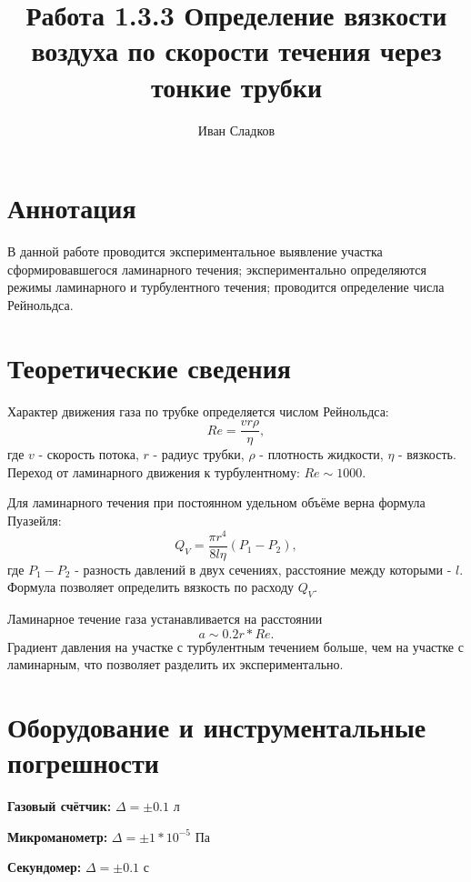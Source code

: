 \documentclass[a4paper]{article}
\title{Работа 1.3.3 Определение вязкости воздуха по скорости течения через тонкие трубки}
\author{Иван Сладков}
\begin{document}
\maketitle
\section{Аннотация}
В данной работе проводится экспериментальное выявление участка сформировавшегося ламинарного течения; экспериментально определяются режимы ламинарного и турбулентного течения; проводится определение числа Рейнольдса.
\section{Теоретические сведения}
Характер движения газа по трубке определяется числом Рейнольдса:
\begin{equation}
Re = \frac{v r \rho}{\eta},
\label{eq:Re}
\end{equation}
где $v$ - скорость потока, $r$ - радиус трубки, $\rho$ - плотность жидкости, $\eta$ - вязкость. Переход от ламинарного движения к турбулентному: $Re \sim 1000$.

Для ламинарного течения при постоянном удельном объёме верна формула Пуазейля:
\begin{equation}
Q_V = \frac{\pi r^4}{8 l \eta}(P_1 - P_2),
\label{eq:Pu}
\end{equation}
где $P_1 - P_2$ - разность давлений в двух сечениях, расстояние между которыми - $l$. Формула позволяет определить вязкость по расходу $Q_V$.

Ламинарное течение газа устанавливается на расстоянии
\begin{equation}
a \sim 0.2 r * Re.
\label{eq:Aa}
\end{equation}
Градиент давления на участке с турбулентным течением больше, чем на участке с ламинарным, что позволяет разделить их экспериментально.
\section{Оборудование и инструментальные погрешности}

{\bf Газовый счётчик: } $\Delta = \pm 0.1 $ л

{\bf Микроманометр: } $\Delta = \pm 1*10^{-5} $ Па

{\bf Секундомер: } $\Delta = \pm 0.1 $ с
\end{document}
